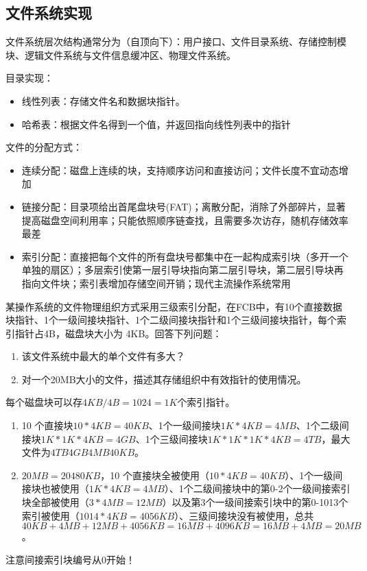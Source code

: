 \subsection{文件系统实现}
文件系统层次结构通常分为（自顶向下）：用户接口、文件目录系统、存储控制模块、逻辑文件系统与文件信息缓冲区、物理文件系统。

目录实现：
\begin{itemize}
    \item 线性列表：存储文件名和数据块指针。
    \item 哈希表：根据文件名得到一个值，并返回指向线性列表中的指针
\end{itemize}

文件的分配方式：
\begin{itemize}
    \item 连续分配：磁盘上连续的块，支持顺序访问和直接访问；文件长度不宜动态增加
    \item 链接分配：目录项给出首尾盘块号(FAT)；离散分配，消除了外部碎片，显著提高磁盘空间利用率；只能依照顺序链查找，且需要多次访存，随机存储效率最差
    \item 索引分配：直接把每个文件的所有盘块号都集中在一起构成索引块（多开一个单独的扇区）；多层索引使第一层引导块指向第二层引导块，第二层引导块再指向文件块；索引表增加存储空间开销；现代主流操作系统常用
\end{itemize}
\begin{example}
    某操作系统的文件物理组织方式采用三级索引分配，在FCB中，有10个直接数据块指针、1个一级间接块指针、1个二级间接块指针和1个三级间接块指针，每个索引指针占4B，磁盘块大小为 4KB。回答下列问题：
    \begin{enumerate}
        \item 该文件系统中最大的单个文件有多大？
        \item 对一个20MB大小的文件，描述其存储组织中有效指针的使用情况。
    \end{enumerate}
\end{example}
\begin{analysis}
    每个磁盘块可以存$4KB/4B=1024=1K$个索引指针。
    \begin{enumerate}
        \item 10 个直接块$10*4KB=40KB$、1个一级间接块$1K*4KB=4MB$、1个二级间接块$1K*1K*4KB=4GB$、1个三级间接块$1K*1K*1K*4KB=4TB$，最大文件为$4TB 4GB 4MB 40KB$。
        \item $20MB=20480KB$，10 个直接块全被使用（$10*4KB=40KB$）、1个一级间接块也被使用（$1K*4KB=4MB$）、1个二级间接块中的第0-2个一级间接索引块全部被使用（$3*4MB=12MB$）以及第3个一级间接索引块中的第0-1013个索引被使用（$ 1014*4KB=4056KB$）、三级间接块没有被使用，总共$40KB+4MB+12MB+4056KB =16MB+4096KB=16MB+4MB=20MB$。
    \end{enumerate}
    注意间接索引块编号从0开始！
\end{analysis}

